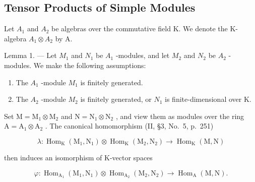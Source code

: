 \subsection{Tensor Products of Simple Modules}

Let \(A_{1}\) and \(A_{2}\) be algebras over the commutative field K. We denote the K-algebra \(A_{1} \otimes A_{2}\) by A.

Lemma 1. --- Let \(M_{1}\) and \(N_{1}\) be \(A_{1}\) -modules, and let \(M_{2}\) and \(N_{2}\) be \(A_{2}\) -modules. We make the following assumptions:

\begin{enumerate}
\def\labelenumi{(\roman{enumi})}
\item
  The \(A_{1}\) -module \(M_{1}\) is finitely generated.
\item
  The \(A_{2}\) -module \(M_{2}\) is finitely generated, or \(N_{1}\) is finite-dimensional over K.
\end{enumerate}

Set \(\mathrm{M} = \mathrm{M}_1\otimes \mathrm{M}_2\) and \(\mathrm{N} = \mathrm{N}_1\otimes \mathrm{N}_2\) , and view them as modules over the ring \(\mathrm{A} = \mathrm{A}_1\otimes \mathrm{A}_2\) . The canonical homomorphism (II, §3, No.~5, p.~251)

\[
\lambda : \operatorname{Hom} _ {\mathrm{K}} (\mathrm{M} _ {1}, \mathrm{N} _ {1}) \otimes \operatorname{Hom} _ {\mathrm{K}} (\mathrm{M} _ {2}, \mathrm{N} _ {2}) \longrightarrow \operatorname{Hom} _ {\mathrm{K}} (\mathrm{M}, \mathrm{N})
\]

then induces an isomorphism of K-vector spaces

\[
\varphi : \operatorname{Hom} _ {\mathrm{A} _ {1}} (\mathrm{M} _ {1}, \mathrm{N} _ {1}) \otimes \operatorname{Hom} _ {\mathrm{A} _ {2}} (\mathrm{M} _ {2}, \mathrm{N} _ {2}) \longrightarrow \operatorname{Hom} _ {\mathrm{A}} (\mathrm{M}, \mathrm{N}).
\]

